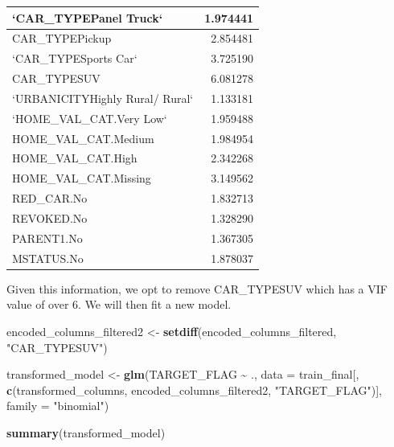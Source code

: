 \documentclass[
]{article}
\newenvironment{Shaded}{\begin{snugshade}}{\end{snugshade}}
\newcommand{\AttributeTok}[1]{\textcolor[rgb]{0.13,0.29,0.53}{#1}}
\newcommand{\FunctionTok}[1]{\textcolor[rgb]{0.13,0.29,0.53}{\textbf{#1}}}
\newcommand{\NormalTok}[1]{#1}
\newcommand{\OtherTok}[1]{\textcolor[rgb]{0.56,0.35,0.01}{#1}}
\newcommand{\SpecialCharTok}[1]{\textcolor[rgb]{0.81,0.36,0.00}{\textbf{#1}}}
\newcommand{\StringTok}[1]{\textcolor[rgb]{0.31,0.60,0.02}{#1}}
\begin{document}
\begin{table}[H]
\begin{tabular}[t]{l|r}
\hline
`CAR\_TYPEPanel Truck` & 1.974441\\
\hline
CAR\_TYPEPickup & 2.854481\\
\hline
`CAR\_TYPESports Car` & 3.725190\\
\hline
CAR\_TYPESUV & 6.081278\\
\hline
`URBANICITYHighly Rural/ Rural` & 1.133181\\
\hline
`HOME\_VAL\_CAT.Very Low` & 1.959488\\
\hline
HOME\_VAL\_CAT.Medium & 1.984954\\
\hline
HOME\_VAL\_CAT.High & 2.342268\\
\hline
HOME\_VAL\_CAT.Missing & 3.149562\\
\hline
RED\_CAR.No & 1.832713\\
\hline
REVOKED.No & 1.328290\\
\hline
PARENT1.No & 1.367305\\
\hline
MSTATUS.No & 1.878037\\
\hline
\end{tabular}
\end{table}

Given this information, we opt to remove CAR\_TYPESUV which has a VIF
value of over 6. We will then fit a new model.

\begin{Shaded}
\begin{Highlighting}[]
\NormalTok{encoded\_columns\_filtered2 }\OtherTok{\textless{}{-}} \FunctionTok{setdiff}\NormalTok{(encoded\_columns\_filtered, }\StringTok{"CAR\_TYPESUV"}\NormalTok{)}

\NormalTok{transformed\_model }\OtherTok{\textless{}{-}} \FunctionTok{glm}\NormalTok{(TARGET\_FLAG }\SpecialCharTok{\textasciitilde{}}\NormalTok{ ., }\AttributeTok{data =}\NormalTok{ train\_final[, }\FunctionTok{c}\NormalTok{(transformed\_columns, encoded\_columns\_filtered2, }\StringTok{"TARGET\_FLAG"}\NormalTok{)], }\AttributeTok{family =} \StringTok{"binomial"}\NormalTok{)}

\FunctionTok{summary}\NormalTok{(transformed\_model)}
\end{Highlighting}
\end{Shaded}
\end{document}

